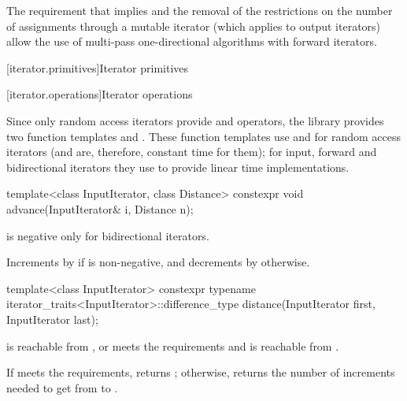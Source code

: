 \documentclass{wg21}
\begin{document}
\pnum
\begin{note}
	The requirement that
	implies
	and the removal of the restrictions on the number of assignments through
	a mutable iterator
	(which applies to output iterators)
	allow the use of multi-pass one-directional algorithms with forward iterators.
\end{note}


[iterator.primitives]{Iterator primitives}

[iterator.operations]{Iterator operations}

\pnum
Since only random access iterators provide
\tcode{+}
and
\tcode{-}
operators, the library provides two
function templates
and
.
These
function templates
use
\tcode{+}
and
\tcode{-}
for random access iterators (and are, therefore, constant
time for them); for input, forward and bidirectional iterators they use
\tcode{++}
to provide linear time
implementations.

%
\begin{itemdecl}
	template<class InputIterator, class Distance>
	constexpr void advance(InputIterator& i, Distance n);
\end{itemdecl}

\begin{itemdescr}
	\pnum
	\expects
	is negative only for bidirectional iterators.
	
	\pnum
	\effects
	Increments  by  if  is non-negative, and
	decrements  by  otherwise.
\end{itemdescr}

%
\begin{itemdecl}
	template<class InputIterator>
	constexpr typename iterator_traits<InputIterator>::difference_type
	distance(InputIterator first, InputIterator last);
\end{itemdecl}

\begin{itemdescr}
	\pnum
	\expects
	 is reachable from , or
	 meets
	the  requirements and
	 is reachable from .
	
	\pnum
	\effects
	If  meets the  requirements,
	returns ; otherwise, returns
	the number of increments needed to get from
	to
	.
\end{itemdescr}
\end{document}
